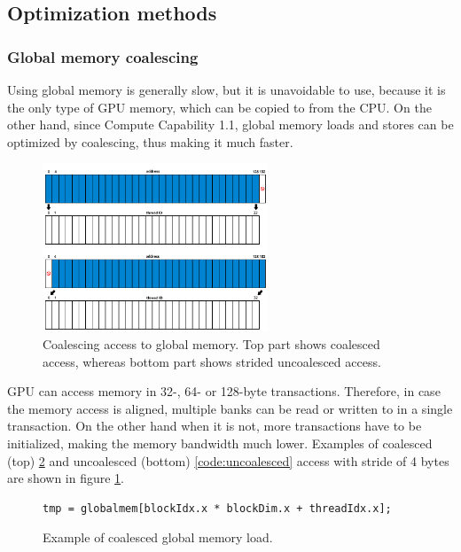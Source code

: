\subsection{Optimization methods}\label{subsec:optimization}

\subsubsection{Global memory coalescing}\label{subsubsec:cuda-coalescing}

Using global memory is generally slow, but it is unavoidable to use, because it is the only type of GPU memory, which can be copied to from the CPU. On the other hand, since Compute Capability 1.1, global memory loads and stores can be optimized by coalescing, thus making it much faster.

\begin{center}
\begin{figure}[ht]
	\centering\includegraphics[width=0.6\textwidth]{fig/coalescing.png}
	\caption{Coalescing access to global memory. Top part shows coalesced access, whereas bottom part shows strided uncoalesced access.}\label{fig:coalescing}
\end{figure}
\end{center}

GPU can access memory in 32-, 64- or 128-byte transactions. Therefore, in case the memory access is aligned, multiple banks can be read or written to in a single transaction. On the other hand when it is not, more transactions have to be initialized, making the memory bandwidth much lower. Examples of coalesced (top) \ref{code:coalesced} and uncoalesced (bottom) \ref{code:uncoalesced} access with stride of 4 bytes are shown in figure \ref{fig:coalescing}.

\begin{figure}[ht]
\begin{verbatim}
tmp = globalmem[blockIdx.x * blockDim.x + threadIdx.x];
\end{verbatim}
\caption{Example of coalesced global memory load.}\label{code:coalesced}
\end{figure}

